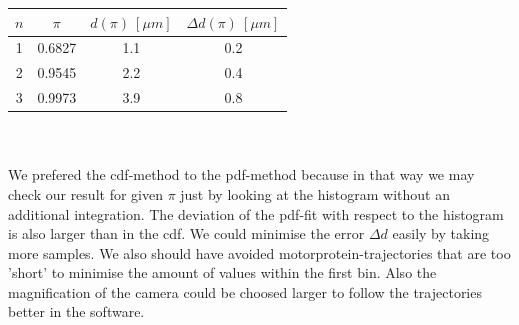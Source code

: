     	\minipanf
    		\centering
    		\begin{tabular}{c|c|c|c}
    	 	       $n$ & $\pi$ & $d(\pi)\ [\unit{\mu m}]$  & $\Delta d(\pi)\ [\unit{\mu m}]$\\
    	 	 \hline		1	& 	0.6827	&	1.1 	& 	0.2\\
    	  				2	&	0.9545	&	2.2		&	0.4\\
    	  				3	&	0.9973	&	3.9		& 	0.8	
    		\end{tabular}
    	\minipend\\
    	\ \\
    	We prefered the cdf-method to the pdf-method because in that way we may check our result for given $\pi$ just by looking at the histogram without an additional integration. The deviation of the pdf-fit with respect to the histogram is also larger than in the cdf. We could minimise the error $\Delta d$ easily by taking more samples. We also should have avoided motorprotein-trajectories that are too 'short' to minimise the amount of values within the first bin. Also the magnification of the camera could be choosed larger to follow the trajectories better in the software.